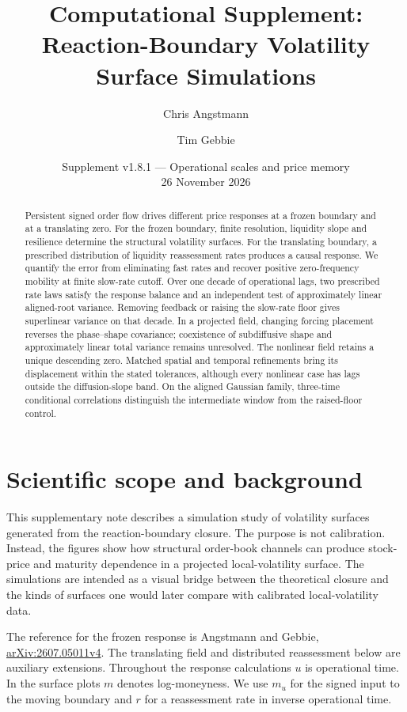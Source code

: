 \documentclass[11pt]{article}
\title{Computational Supplement:\\Reaction-Boundary Volatility Surface Simulations}
\author{Chris Angstmann \and Tim Gebbie}
\date{Supplement v1.8.1 --- Operational scales and price memory\\26 November 2026}
\begin{document}
\maketitle

\begin{abstract}
Persistent signed order flow drives different price responses at a frozen boundary and at a translating zero. For the frozen boundary, finite resolution, liquidity slope and resilience determine the structural volatility surfaces. For the translating boundary, a prescribed distribution of liquidity reassessment rates produces a causal response. We quantify the error from eliminating fast rates and recover positive zero-frequency mobility at finite slow-rate cutoff. Over one decade of operational lags, two prescribed rate laws satisfy the response balance and an independent test of approximately linear aligned-root variance. Removing feedback or raising the slow-rate floor gives superlinear variance on that decade. In a projected field, changing forcing placement reverses the phase--shape covariance; coexistence of subdiffusive shape and approximately linear total variance remains unresolved. The nonlinear field retains a unique descending zero. Matched spatial and temporal refinements bring its displacement within the stated tolerances, although every nonlinear case has lags outside the diffusion-slope band. On the aligned Gaussian family, three-time conditional correlations distinguish the intermediate window from the raised-floor control.
\end{abstract}
\tableofcontents

\section{Scientific scope and background}

This supplementary note describes a simulation study of volatility surfaces
generated from the reaction-boundary closure. The purpose is not calibration.
Instead, the figures show how structural order-book channels can produce
stock-price and maturity dependence in a projected local-volatility surface.
The simulations are intended as a visual bridge between the theoretical
closure and the kinds of surfaces one would later compare with calibrated
local-volatility data.

The reference for the frozen response is Angstmann and Gebbie,
\href{https://arxiv.org/abs/2607.05011v4}{arXiv:2607.05011v4}.
The translating field and distributed reassessment below are auxiliary
extensions. Throughout the response calculations \(u\) is operational
time. In the surface plots \(m\) denotes log-moneyness. We use \(m_u\)
for the signed input to the moving boundary and \(r\) for a reassessment
rate in inverse operational time.
\end{document}
